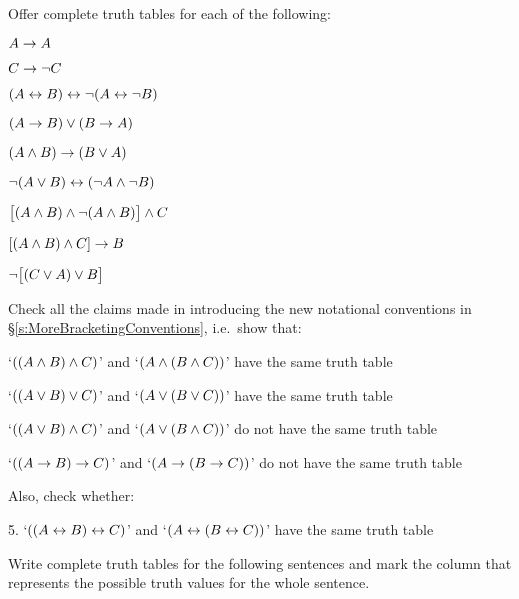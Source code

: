 \practiceproblems\label{pr.TT.TTorC}
\problempart
Offer complete truth tables for each of the following:
\begin{earg}
\item $A \rightarrow A$ %
\item $C \rightarrow\neg C$ %
\item $(A \leftrightarrow B) \leftrightarrow \neg(A\leftrightarrow \neg B)$ %
\item $(A \rightarrow B) \vee (B \rightarrow A)$ %
\item $(A \wedge B) \rightarrow (B \vee A)$  %
\item $\neg(A \vee B) \leftrightarrow (\neg A \wedge \neg B)$ %
\item $\bigl[(A\wedge B) \wedge\neg(A\wedge B)\bigr] \wedge C$ %
\item $[(A \wedge B) \wedge C] \rightarrow B$ %
\item $\neg\bigl[(C\vee A) \vee B\bigr]$ %
\end{earg}
\problempart
Check all the claims made in introducing the new notational conventions in \S\ref{s:MoreBracketingConventions}, i.e.\ show that:
\begin{earg}
	\item `$((A \wedge B) \wedge C)$' and `$(A \wedge (B \wedge C))$' have the same truth table
	\item `$((A \vee B) \vee C)$' and `$(A \vee (B \vee C))$' have the same truth table
	\item `$((A \vee B) \wedge C)$' and `$(A \vee (B \wedge C))$' do not have the same truth table
	\item `$((A \rightarrow B) \rightarrow C)$' and `$(A \rightarrow (B \rightarrow C))$' do not have the same truth table
\end{earg}
Also, check whether:
\begin{earg}
	\item[5.] `$((A \leftrightarrow B) \leftrightarrow C)$' and `$(A \leftrightarrow (B \leftrightarrow C))$' have the same truth table
\end{earg}

\problempart
Write complete truth tables for the following sentences and mark the column that represents the possible truth values for the whole sentence.

